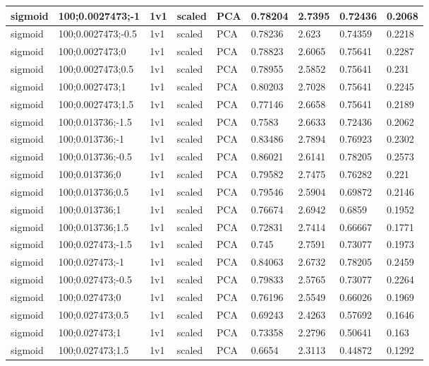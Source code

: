 \begin{longtable}{lllllllll}
sigmoid & 100;0.0027473;-1 & 1v1 & scaled & PCA & 0.78204 & 2.7395 & 0.72436 & 0.2068\\ \hline
sigmoid & 100;0.0027473;-0.5 & 1v1 & scaled & PCA & 0.78236 & 2.623 & 0.74359 & 0.2218\\ \hline
sigmoid & 100;0.0027473;0 & 1v1 & scaled & PCA & 0.78823 & 2.6065 & 0.75641 & 0.2287\\ \hline
sigmoid & 100;0.0027473;0.5 & 1v1 & scaled & PCA & 0.78955 & 2.5852 & 0.75641 & 0.231\\ \hline
sigmoid & 100;0.0027473;1 & 1v1 & scaled & PCA & 0.80203 & 2.7028 & 0.75641 & 0.2245\\ \hline
sigmoid & 100;0.0027473;1.5 & 1v1 & scaled & PCA & 0.77146 & 2.6658 & 0.75641 & 0.2189\\ \hline
sigmoid & 100;0.013736;-1.5 & 1v1 & scaled & PCA & 0.7583 & 2.6633 & 0.72436 & 0.2062\\ \hline
sigmoid & 100;0.013736;-1 & 1v1 & scaled & PCA & 0.83486 & 2.7894 & 0.76923 & 0.2302\\ \hline
sigmoid & 100;0.013736;-0.5 & 1v1 & scaled & PCA & 0.86021 & 2.6141 & 0.78205 & 0.2573\\ \hline
sigmoid & 100;0.013736;0 & 1v1 & scaled & PCA & 0.79582 & 2.7475 & 0.76282 & 0.221\\ \hline
sigmoid & 100;0.013736;0.5 & 1v1 & scaled & PCA & 0.79546 & 2.5904 & 0.69872 & 0.2146\\ \hline
sigmoid & 100;0.013736;1 & 1v1 & scaled & PCA & 0.76674 & 2.6942 & 0.6859 & 0.1952\\ \hline
sigmoid & 100;0.013736;1.5 & 1v1 & scaled & PCA & 0.72831 & 2.7414 & 0.66667 & 0.1771\\ \hline
sigmoid & 100;0.027473;-1.5 & 1v1 & scaled & PCA & 0.745 & 2.7591 & 0.73077 & 0.1973\\ \hline
sigmoid & 100;0.027473;-1 & 1v1 & scaled & PCA & 0.84063 & 2.6732 & 0.78205 & 0.2459\\ \hline
sigmoid & 100;0.027473;-0.5 & 1v1 & scaled & PCA & 0.79833 & 2.5765 & 0.73077 & 0.2264\\ \hline
sigmoid & 100;0.027473;0 & 1v1 & scaled & PCA & 0.76196 & 2.5549 & 0.66026 & 0.1969\\ \hline
sigmoid & 100;0.027473;0.5 & 1v1 & scaled & PCA & 0.69243 & 2.4263 & 0.57692 & 0.1646\\ \hline
sigmoid & 100;0.027473;1 & 1v1 & scaled & PCA & 0.73358 & 2.2796 & 0.50641 & 0.163\\ \hline
sigmoid & 100;0.027473;1.5 & 1v1 & scaled & PCA & 0.6654 & 2.3113 & 0.44872 & 0.1292\\ \hline

\end{longtable}
